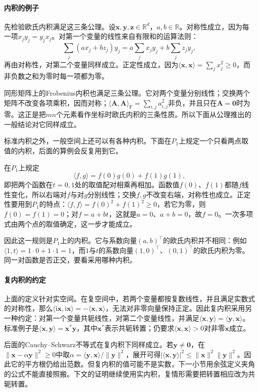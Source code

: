 \paragraph{内积的例子}
先检验欧氏内积满足这三条公理。设$\bm x,\bm y,\bm z\in\mathbb R^d$，$a,b\in\mathbb R$。对称性成立，因为每一项$x_jy_j=y_jx_j$。对第一个变量的线性来自有限和的运算法则：
\[
 \sum_j(ax_j+bz_j)y_j=a\sum_jx_jy_j+b\sum_jz_jy_j,
\]
再由对称性，对第二个变量同样成立。正定性成立，因为$\langle\bm x,\bm x\rangle=\sum_jx_j^2\geq0$，而非负数之和为零时每一项都为零。

同形矩阵上的Frobenius内积也满足三条公理。它对两个变量分别线性；交换两个矩阵不改变各项乘积，因而对称；$\langle\bm A,\bm A\rangle_{\mathrm F}=\sum_{i,j}a_{i,j}^2$非负，并且只在$\bm A=\bm0$时为零。这正是把$mn$个元素看作坐标时欧氏内积的三条性质。所以下面从公理推出的一般结论对它同样成立。

标准内积之外，一般空间上还可以有各种内积。下面在$P_1$上规定一个只看两点取值的内积，后面的算例会反复用到它。
\begin{example}[只看两点取值的内积]
\label{ex:ls-two-point-inner-product}
在$P_1$上规定
\[
 \langle f,g\rangle=f(0)g(0)+f(1)g(1),
\]
即把两个函数在$t=0,1$处的取值配对相乘再相加。函数值$f(0)$、$f(1)$都随$f$线性变化，所以右端对$f$与对$g$分别线性；交换$f,g$不改变右端，对称性也成立。正定性要用到$P_1$的特点：$\langle f,f\rangle=f(0)^2+f(1)^2\geq0$，若它为零，则$f(0)=f(1)=0$；对$f=a+bt$，这就是$a=0$、$a+b=0$，故$f=0$。一次多项式由两个点的取值确定，这一步才能成立。

因此这一规则是$P_1$上的内积。它与系数向量$(a,b)^\top$的欧氏内积并不相同：例如$\langle1,t\rangle=1\cdot0+1\cdot1=1$，而$1$与$t$的系数向量$(1,0)^\top$、$(0,1)^\top$的欧氏内积为零。同一对函数是否正交，要看采用哪种内积。
\end{example}

\paragraph{复内积的约定}
上面的定义针对实空间。在复空间中，若两个变量都按复数线性，并且满足实数式的对称性，那么$\langle\mathrm i\bm x,\mathrm i\bm x\rangle=-\langle\bm x,\bm x\rangle$，无法对非零向量保持正定。因此复内积采用另一种约定：对第一个变量共轭线性，对第二个变量线性，并满足$\langle\bm x,\bm y\rangle=\overline{\langle\bm y,\bm x\rangle}$。标准例子是$\langle\bm x,\bm y\rangle=\bm x^*\bm y$，其中$\bm x^*$表示共轭转置；仍要求$\langle\bm x,\bm x\rangle>0$对非零$\bm x$成立。

后面的Cauchy--Schwarz不等式在复内积下同样成立。若$\bm y\ne\bm0$，在$\lVert\bm x-\alpha\bm y\rVert^2\geq0$中取$\alpha=\langle\bm y,\bm x\rangle/\lVert\bm y\rVert^2$，展开可得$|\langle\bm x,\bm y\rangle|^2\leq\lVert\bm x\rVert^2\lVert\bm y\rVert^2$。因此它的平方根仍给出范数。但复内积的值可能不是实数，下一小节用余弦定义夹角的公式不能直接照搬。下文的证明继续使用实内积，复情形需要把转置相应改为共轭转置。

